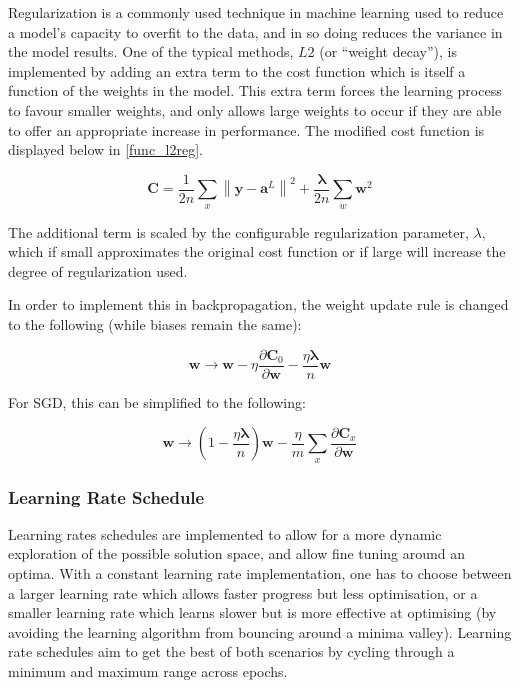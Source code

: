 \documentclass[a4paper,11pt,oneside]{article}
\theoremstyle{plain}
\theoremstyle{definition}
\begin{document}
	Regularization is a commonly used technique in machine learning used to reduce a model's capacity to overfit to the data, and in so doing reduces the variance in the model results. One of the typical methods, $L2$ (or ``weight decay''), is implemented by adding an extra term to the cost function which is itself a function of the weights in the model. This extra term forces the learning process to favour smaller weights, and only allows large weights to occur if they are able to offer an appropriate increase in performance. The modified cost function is displayed below in \ref{func_l2reg}.
	
	\begin{equation}\label{func_l2reg}
	\mathbf{C}=\frac{1}{2 n} \sum_{x}\left\|\mathbf{y}-\mathbf{a}^{L}\right\|^{2}+\frac{\mathbf{\lambda}}{2 n} \sum_{w} \mathbf{w}^{2}
	\end{equation}
	
	The additional term is scaled by the configurable regularization parameter, $\lambda$, which if small approximates the original cost function or if large will increase the degree of regularization used. \newline
	
	In order to implement this in backpropagation, the weight update rule is changed to the following (while biases remain the same):
	
	\begin{equation}\label{func_l2_weight_update}
	\mathbf{w} \rightarrow \mathbf{w}-\eta \frac{\partial \mathbf{C}_{0}}{\partial \mathbf{w}}-\frac{\eta \mathbf{\lambda}}{n} \mathbf{w}
	\end{equation}
	
	For SGD, this can be simplified to the following: 
	
	\begin{equation}\label{func_sgd_l2}
	\mathbf{w} \rightarrow\left(1-\frac{\eta \mathbf{\lambda}}{n}\right) \mathbf{w}-\frac{\eta}{m} \sum_{x} \frac{\partial \mathbf{C}_{x}}{\partial \mathbf{w}}
	\end{equation}
	
	
	\subsubsection{Learning Rate Schedule}\label{imp_learning_rate_schedule}
	
	Learning rates schedules are implemented to allow for a more dynamic exploration of the possible solution space, and allow fine tuning around an optima. With a constant learning rate implementation, one has to choose between a larger learning rate which allows faster progress but less optimisation, or a smaller learning rate which learns slower but is more effective at optimising (by avoiding the learning algorithm from bouncing around a minima valley). Learning rate schedules aim to get the best of both scenarios by cycling through a minimum and maximum range across epochs.\newline
	
\end{document}
